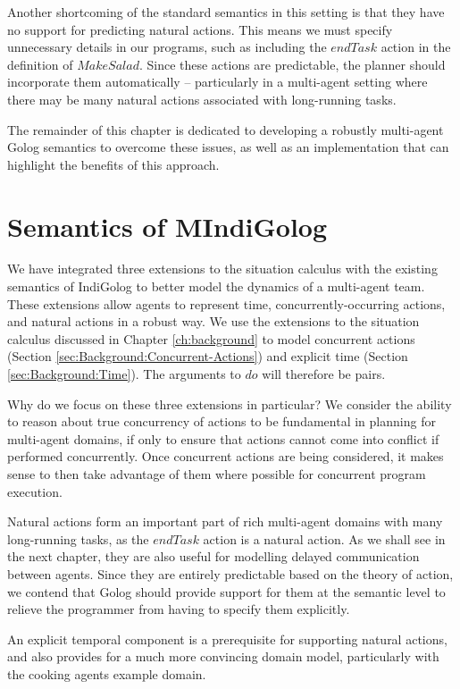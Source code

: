 Another shortcoming of the standard semantics in this setting is that
they have no support for predicting natural actions. This means we
must specify unnecessary details in our programs, such as including
the $endTask$ action in the definition of $MakeSalad$. Since these
actions are predictable, the planner should incorporate them automatically
-- particularly in a multi-agent setting where there may be many natural
actions associated with long-running tasks.

The remainder of this chapter is dedicated to developing a robustly
multi-agent Golog semantics to overcome these issues, as well as an
implementation that can highlight the benefits of this approach.


\section{Semantics of MIndiGolog\label{sec:MIndiGolog:Semantics}}

We have integrated three extensions to the situation calculus with
the existing semantics of IndiGolog to better model the dynamics of
a multi-agent team. These extensions allow agents to represent time,
concurrently-occurring actions, and natural actions in a robust way.
We use the extensions to the situation calculus discussed in Chapter
\ref{ch:background} to model concurrent actions (Section \ref{sec:Background:Concurrent-Actions})
and explicit time (Section \ref{sec:Background:Time}). The arguments
to $do$ will therefore be  pairs.

Why do we focus on these three extensions in particular? We consider
the ability to reason about true concurrency of actions to be fundamental
in planning for multi-agent domains, if only to ensure that actions
cannot come into conflict if performed concurrently. Once concurrent
actions are being considered, it makes sense to then take advantage
of them where possible for concurrent program execution.

Natural actions form an important part of rich multi-agent domains
with many long-running tasks, as the $endTask$ action is a natural
action. As we shall see in the next chapter, they are also useful
for modelling delayed communication between agents. Since they are
entirely predictable based on the theory of action, we contend that
Golog should provide support for them at the semantic level to relieve
the programmer from having to specify them explicitly.

An explicit temporal component is a prerequisite for supporting natural
actions, and also provides for a much more convincing domain model,
particularly with the cooking agents example domain.


